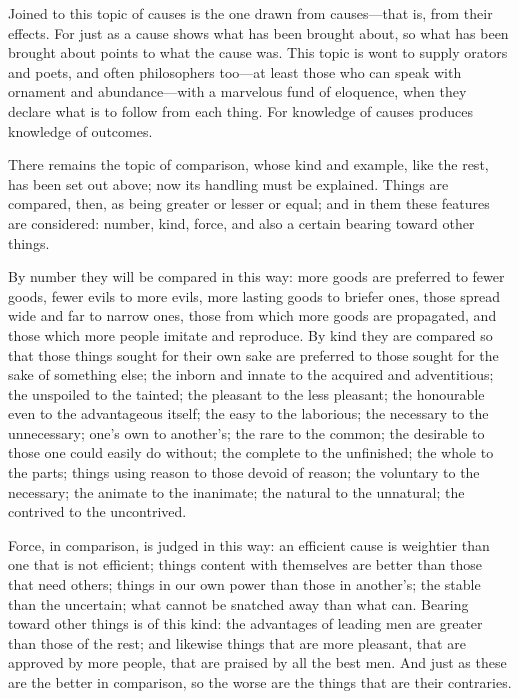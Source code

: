  Joined to this topic of causes is the one drawn from causes—that is, from their effects. For just as a cause shows what has been brought about, so what has been brought about points to what the cause was. This topic is wont to supply orators and poets, and often philosophers too—at least those who can speak with ornament and abundance—with a marvelous fund of eloquence, when they declare what is to follow from each thing. For knowledge of causes produces knowledge of outcomes.

 There remains the topic of comparison, whose kind and example, like the rest, has been set out above; now its handling must be explained. Things are compared, then, as being greater or lesser or equal; and in them these features are considered: number, kind, force, and also a certain bearing toward other things.

 By number they will be compared in this way: more goods are preferred to fewer goods, fewer evils to more evils, more lasting goods to briefer ones, those spread wide and far to narrow ones, those from which more goods are propagated, and those which more people imitate and reproduce. By kind they are compared so that those things sought for their own sake are preferred to those sought for the sake of something else; the inborn and innate to the acquired and adventitious; the unspoiled to the tainted; the pleasant to the less pleasant; the honourable even to the advantageous itself; the easy to the laborious; the necessary to the unnecessary; one's own to another's; the rare to the common; the desirable to those one could easily do without; the complete to the unfinished; the whole to the parts; things using reason to those devoid of reason; the voluntary to the necessary; the animate to the inanimate; the natural to the unnatural; the contrived to the uncontrived.

 Force, in comparison, is judged in this way: an efficient cause is weightier than one that is not efficient; things content with themselves are better than those that need others; things in our own power than those in another's; the stable than the uncertain; what cannot be snatched away than what can. Bearing toward other things is of this kind: the advantages of leading men are greater than those of the rest; and likewise things that are more pleasant, that are approved by more people, that are praised by all the best men. And just as these are the better in comparison, so the worse are the things that are their contraries.


